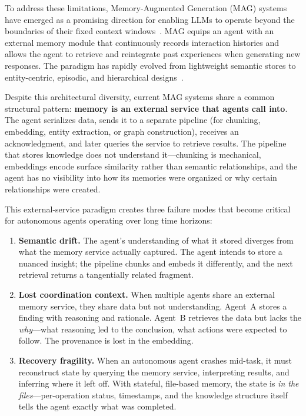 \documentclass[11pt]{article}
\begin{document}
To address these limitations, Memory-Augmented Generation (MAG) systems have emerged
as a promising direction for enabling LLMs to operate beyond the boundaries of their fixed context windows~\citep{xu2025amem,nan2025nemori,jiang2026magma,chhikara2025mem0}.
MAG equips an agent with an external memory module that continuously records interaction histories
and allows the agent to retrieve and reintegrate past experiences when generating new responses.
The paradigm has rapidly evolved from lightweight semantic stores to entity-centric,
episodic, and hierarchical designs~\citep{jiang2026anatomy}.

Despite this architectural diversity, current MAG systems share a common structural pattern:
\textbf{memory is an external service that agents call into}.
The agent serializes data, sends it to a separate pipeline (for chunking, embedding, entity extraction, or graph construction),
receives an acknowledgment, and later queries the service to retrieve results.
The pipeline that stores knowledge does not understand it---chunking is mechanical,
embeddings encode surface similarity rather than semantic relationships,
and the agent has no visibility into how its memories were organized or why certain relationships were created.

This external-service paradigm creates three failure modes
that become critical for autonomous agents operating over long time horizons:

\begin{enumerate}[leftmargin=*]
  \item \textbf{Semantic drift.}
    The agent's understanding of what it stored diverges from what the memory service actually captured.
    The agent intends to store a nuanced insight; the pipeline chunks and embeds it differently,
    and the next retrieval returns a tangentially related fragment.

  \item \textbf{Lost coordination context.}
    When multiple agents share an external memory service, they share data but not understanding.
    Agent~A stores a finding with reasoning and rationale.
    Agent~B retrieves the data but lacks the \emph{why}---what reasoning led to the conclusion,
    what actions were expected to follow.
    The provenance is lost in the embedding.

  \item \textbf{Recovery fragility.}
    When an autonomous agent crashes mid-task, it must reconstruct state by querying the memory service,
    interpreting results, and inferring where it left off.
    With stateful, file-based memory, the state is \emph{in the files}---per-operation status,
    timestamps, and the knowledge structure itself tells the agent exactly what was completed.
\end{enumerate}
\end{document}
